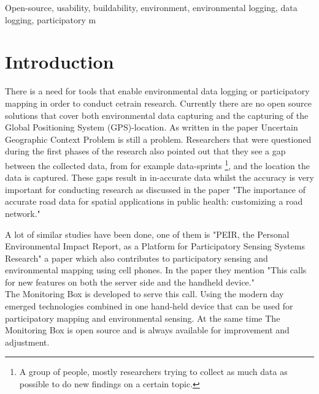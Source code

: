 \documentclass[conference]{IEEEtran}
\begin{document}
\begin{IEEEkeywords}
Open-source, usability, buildability, environment, environmental logging, data logging, participatory m%
\end{IEEEkeywords}

\IEEEpeerreviewmaketitle
\section{Introduction}
There is a need for tools that enable environmental data logging or participatory mapping in order to conduct cetrain research. Currently there are no open source solutions that cover both environmental data capturing and the capturing of the Global Positioning System (GPS)-location. As written in the paper Uncertain Geographic Context Problem \cite{kwan2012uncertain} is still a problem. Researchers that were questioned during the first phases of the research also pointed out that they see a gap  between the collected data, from for example data-sprints \footnote{A group of people, mostly researchers trying to collect as much data as possible to do new findings on a certain topic.}, and the location the data is captured. These gaps result in in-accurate data whilst the accuracy is very important for conducting research as discussed in the paper "The importance of accurate road data for spatial applications in public health: customizing a road network." \cite{frizzelle2009importance}

\par
A lot of similar studies have been done, one of them is "PEIR, the Personal Environmental Impact Report, as a Platform for Participatory Sensing Systems Research"
 \cite{mun2009peir} a paper which also contributes to participatory sensing and environmental mapping using cell phones. In the paper they mention "This calls for new
features on both the server side and the handheld device."  \cite{mun2009peir} \\
The Monitoring Box is developed to serve this call. Using the modern day emerged technologies combined in one hand-held device that can be used for participatory mapping and environmental sensing. At the same time The Monitoring Box is open source and is always available for improvement and adjustment.  
\end{document}
